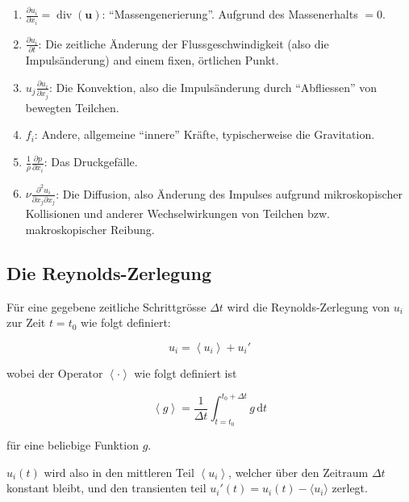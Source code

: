 \begin{enumerate}
    \item $\frac{\partial u_i}{\partial x_i} = \operatorname{div}(\mathbf{u})$: ``Massengenerierung''.
    Aufgrund des Massenerhalts $ = 0$.
    \item $\frac{\partial u_i}{\partial t}$: Die zeitliche Änderung der Flussgeschwindigkeit (also die 
        Impulsänderung) and einem fixen, örtlichen Punkt.
    \item $u_j \frac{\partial u_i}{\partial x_j}$: Die Konvektion, also die Impulsänderung durch ``Abfliessen''
        von bewegten Teilchen.
    \item $f_i$: Andere, allgemeine ``innere'' Kräfte, typischerweise die Gravitation.
    \item $\frac{1}{\rho} \frac{\partial p}{\partial x_i}$: Das Druckgefälle.
    \item $\nu \frac{\partial^2 u_i}{\partial x_j \partial x_j}$: Die Diffusion, also Änderung des Impulses
        aufgrund mikroskopischer Kollisionen und anderer Wechselwirkungen von Teilchen bzw.
        makroskopischer Reibung.
\end{enumerate}

\subsection{Die Reynolds-Zerlegung}

Für eine gegebene zeitliche Schrittgrösse $\Delta t$ wird die Reynolds-Zerlegung von $u_i$ zur Zeit $t = t_0$
wie folgt definiert:

\newcommand{\ravg}[1]{\ensuremath{\left\langle #1 \right\rangle}}
\newcommand{\rdecomp}[1]{\ensuremath{\ravg{#1} + #1'}}

\begin{equation}
    \label{reynolds:eqs:reynolds-decomp}
    u_i = \rdecomp{u_i}
\end{equation}

wobei der Operator $\ravg{\cdot}$ wie folgt definiert ist

\begin{equation}
    \ravg{g} = \frac{1}{\Delta t}\int_{t=t_0}^{t_0 + \Delta t} g \mathrm{\,d}t
\end{equation}

für eine beliebige Funktion $g$.

$u_i(t)$ wird also in den mittleren Teil $\ravg{u_i}$, welcher über den Zeitraum
$\Delta t$ konstant bleibt, und den transienten teil $u_i'(t) = u_i(t) - \langle u_i \rangle$
zerlegt.


